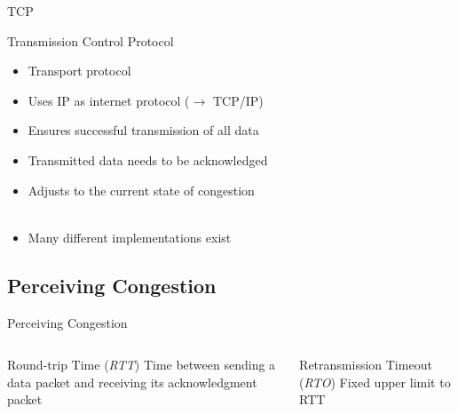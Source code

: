\documentclass[english,aspectratio=43,t]{beamer}
\begin{document}
\begin{frame}{TCP}
~\\
\begin{block}{Transmission Control Protocol}
\begin{itemize}
\item Transport protocol
\item Uses IP as internet protocol ($\rightarrow$ TCP/IP)
\item<2-> Ensures successful transmission of all data
\end{itemize}
\end{block}
\begin{itemize}
\item<3-> Transmitted data needs to be acknowledged
\item<3-> Adjusts to the current state of congestion
~\\~\\
\item<4-> Many different implementations exist
\end{itemize}
\end{frame}

\subsection*{Perceiving Congestion}
\label{sec:pc}

\begin{frame}{Perceiving Congestion}
\begin{columns}
\begin{column}{0.5\textwidth}
\begin{block}{Round-trip Time (\textit{RTT})}
Time between sending a data packet and receiving its acknowledgment packet
\end{block}
\end{column}
\begin{column}{0.5\textwidth}
\begin{block}{Retransmission Timeout (\textit{RTO})}
Fixed upper limit to RTT
\end{block}
\end{column}
\end{columns}
~\\~\\
\end{frame}
\end{document}
